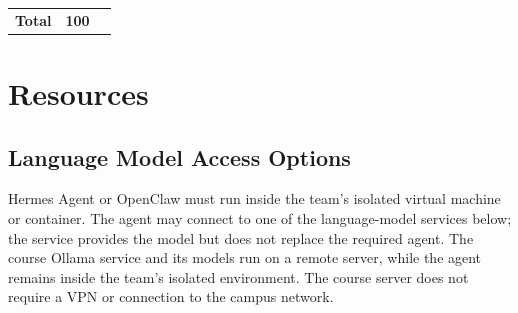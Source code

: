 \documentclass[12pt,letterpaper]{article}
\begin{document}
\begin{longtable}{|p{}|p{}|p{}|}
    \hline
    \textbf{Total}                               & \textbf{100}    &                                                                                                                                                                                                                                                                                                                                                                                                                                                                                                                                                                                                                                                                                                                                                           \\
\end{longtable}

\section{Resources}
\subsection{Language Model Access Options}
Hermes Agent or OpenClaw must run inside the team's isolated virtual machine or container. The agent may connect to one of the language-model services below; the service provides the model but does not replace the required agent. The course Ollama service and its models run on a remote server, while the agent remains inside the team's isolated environment. The course server does not require a VPN or connection to the campus network.
\end{document}
